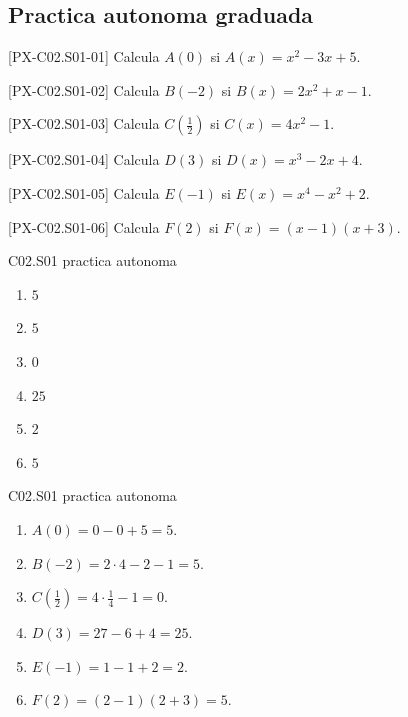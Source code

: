 \subsection*{Practica autonoma graduada}
\begin{exercise}{[PX-C02.S01-01] Calcula \(A(0)\) si \(A(x)=x^2-3x+5\).}
\end{exercise}
\begin{exercise}{[PX-C02.S01-02] Calcula \(B(-2)\) si \(B(x)=2x^2+x-1\).}
\end{exercise}
\begin{exercise}{[PX-C02.S01-03] Calcula \(C\left(\tfrac{1}{2}\right)\) si \(C(x)=4x^2-1\).}
\end{exercise}
\begin{exercise}{[PX-C02.S01-04] Calcula \(D(3)\) si \(D(x)=x^3-2x+4\).}
\end{exercise}
\begin{exercise}{[PX-C02.S01-05] Calcula \(E(-1)\) si \(E(x)=x^4-x^2+2\).}
\end{exercise}
\begin{exercise}{[PX-C02.S01-06] Calcula \(F(2)\) si \(F(x)=(x-1)(x+3)\).}
\end{exercise}

\begin{shortanswer}{C02.S01 practica autonoma}
\begin{enumerate}[label=\textbf{PX-C02.S01-\arabic*:}, leftmargin=*]
  \item \(5\)
  \item \(5\)
  \item \(0\)
  \item \(25\)
  \item \(2\)
  \item \(5\)
\end{enumerate}
\end{shortanswer}

\begin{fullsolution}{C02.S01 practica autonoma}
\begin{enumerate}[label=\textbf{PX-C02.S01-\arabic*:}, leftmargin=*]
  \item \(A(0)=0-0+5=5\).
  \item \(B(-2)=2\cdot 4-2-1=5\).
  \item \(C\left(\tfrac{1}{2}\right)=4\cdot \tfrac{1}{4}-1=0\).
  \item \(D(3)=27-6+4=25\).
  \item \(E(-1)=1-1+2=2\).
  \item \(F(2)=(2-1)(2+3)=5\).
\end{enumerate}
\end{fullsolution}

